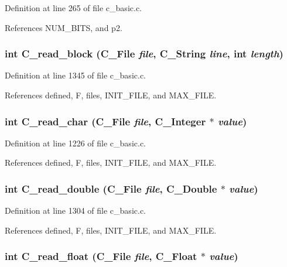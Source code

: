 Definition at line 265 of file c\_\-basic.c.

References NUM\_\-BITS, and p2.
\subsubsection{\setlength{\rightskip}{0pt plus 5cm}int C\_\-read\_\-block (\bf{C\_\-File} {\em file}, \bf{C\_\-String} {\em line}, int {\em length})}\label{c__basic_8h_6d27dd666bd57789ada8449dd1689237}




Definition at line 1345 of file c\_\-basic.c.

References defined, F, files, INIT\_\-FILE, and MAX\_\-FILE.
\subsubsection{\setlength{\rightskip}{0pt plus 5cm}int C\_\-read\_\-char (\bf{C\_\-File} {\em file}, \bf{C\_\-Integer} $\ast$ {\em value})}\label{c__basic_8h_baadc7c497766b546221a015d0173b51}




Definition at line 1226 of file c\_\-basic.c.

References defined, F, files, INIT\_\-FILE, and MAX\_\-FILE.
\subsubsection{\setlength{\rightskip}{0pt plus 5cm}int C\_\-read\_\-double (\bf{C\_\-File} {\em file}, \bf{C\_\-Double} $\ast$ {\em value})}\label{c__basic_8h_ae3fc70d5bb1f959a1f5bd4cae2e4517}




Definition at line 1304 of file c\_\-basic.c.

References defined, F, files, INIT\_\-FILE, and MAX\_\-FILE.
\subsubsection{\setlength{\rightskip}{0pt plus 5cm}int C\_\-read\_\-float (\bf{C\_\-File} {\em file}, \bf{C\_\-Float} $\ast$ {\em value})}\label{c__basic_8h_332c79f40c5b2ea09db2eb3b3a8524c7}





